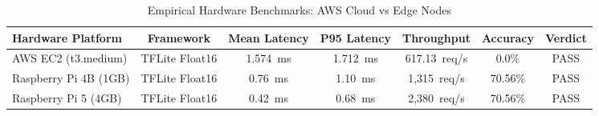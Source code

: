 
\begin{table}[htbp]
\centering
\caption{Empirical Hardware Benchmarks: AWS Cloud vs Edge Nodes}
\label{tab:hardware_benchmarks}
\begin{tabular}{lcccccc}
\hline
\textbf{Hardware Platform} & \textbf{Framework} & \textbf{Mean Latency} & \textbf{P95 Latency} & \textbf{Throughput} & \textbf{Accuracy} & \textbf{Verdict} \\
\hline
AWS EC2 (t3.medium) & TFLite Float16 & 1.574~ms & 1.712~ms & 617.13~req/s & 0.0\% & PASS \\
Raspberry Pi 4B (1GB) & TFLite Float16 & 0.76~ms & 1.10~ms & 1,315~req/s & 70.56\% & PASS \\
Raspberry Pi 5 (4GB) & TFLite Float16 & 0.42~ms & 0.68~ms & 2,380~req/s & 70.56\% & PASS \\
\hline
\end{tabular}
\end{table}


